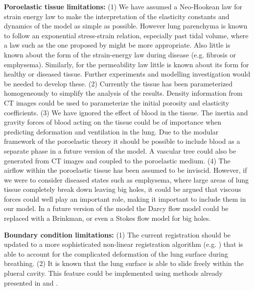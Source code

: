 \noindent \textbf{Poroelastic tissue limitations:} (1) We have assumed a Neo-Hookean law for strain energy law to make the interpretation of the elasticity constants and dynamics of the model as simple as possible. However lung parenchyma is known to follow an exponential stress-strain relation, especially past tidal volume, where a law such as the one proposed by \cite{fung1975stress} might be more appropriate. Also little is known about the form of the strain-energy law during disease (e.g. fibrosis or emphysema). Similarly, for the permeability law little is known about its form for healthy or diseased tissue. Further experiments and modelling investigation would be needed to develop these. (2) Currently the tissue has been parameterized homogeneously to simplify the analysis of the results. Density information from CT images could be used to parameterize the initial porosity and elasticity coefficients. (3) We have ignored the effect of blood in the tissue. The inertia and gravity forces of blood acting on the tissue could be of importance when
predicting deformation and ventilation in the lung. Due to the modular framework of the poroelastic theory it should be possible to include blood as a separate phase in a future version of the model. A vascular tree could also be generated from CT images and coupled to the poroelastic medium. (4) The airflow within the poroelastic tissue has been assumed to be inviscid. However, if we were to consider diseased states such as emphysema, where large areas of lung tissue completely break down leaving big holes, it could be argued that viscous forces could well play an important role, making it important to include them in our model. In a future version of the model the Darcy flow model could be replaced with a Brinkman, or even a Stokes flow model for big holes. %


\noindent \textbf{Boundary condition limitations:} (1) The current registration should be updated to a more sophisticated non-linear registration algorithm (e.g. \cite{jahani2014assessment,yin2013multiscale,heinrich2013mrf}) that is able to account for the complicated deformation of the lung surface during breathing. (2) It is known that the lung surface is able to slide freely within the plueral cavity. This feature could be implemented using methods already presented in \cite{kowalczyk1994modelling} and \cite{ateshian2010finite}.

